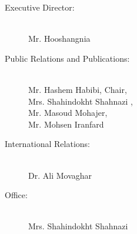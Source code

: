 {\begin{myfbox}
{\begin{description}
\item[Executive Director:] \ \\  
             Mr. Hooshangnia

\item[Public Relations and Publications:] \ \\ 
             Mr. Hashem Habibi, Chair,\\
             Mrs. Shahindokht Shahnazi , \\
             Mr. Masoud Mohajer, \\
             Mr. Mohsen Iranfard

\item[International  Relations:] \ \\ 
             Dr. Ali Movaghar

\item[Office:] \ \\ 
           Mrs. Shahindokht Shahnazi 
                  
\end{description}
\vfill

}
\end{myfbox}
}



